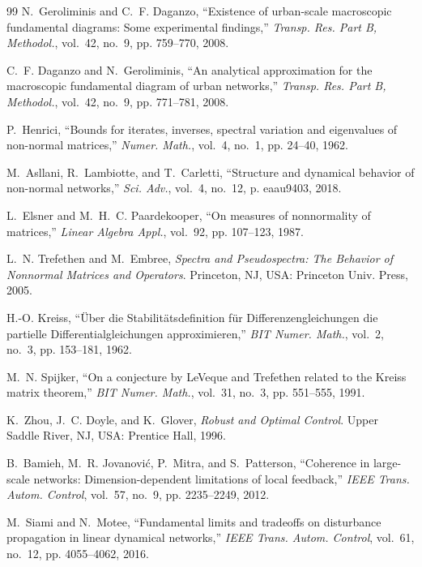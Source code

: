 \documentclass[journal]{IEEEtran}
\begin{document}
\begin{thebibliography}{99}
N.~Geroliminis and C.~F. Daganzo, ``Existence of urban-scale macroscopic fundamental diagrams: Some experimental findings,'' \emph{Transp. Res. Part B, Methodol.}, vol.~42, no.~9, pp. 759--770, 2008.

C.~F. Daganzo and N.~Geroliminis, ``An analytical approximation for the macroscopic fundamental diagram of urban networks,'' \emph{Transp. Res. Part B, Methodol.}, vol.~42, no.~9, pp. 771--781, 2008.

P.~Henrici, ``Bounds for iterates, inverses, spectral variation and eigenvalues of non-normal matrices,'' \emph{Numer. Math.}, vol.~4, no.~1, pp. 24--40, 1962.

M.~Asllani, R.~Lambiotte, and T.~Carletti, ``Structure and dynamical behavior of non-normal networks,'' \emph{Sci. Adv.}, vol.~4, no.~12, p. eaau9403, 2018.

L.~Elsner and M.~H.~C. Paardekooper, ``On measures of nonnormality of matrices,'' \emph{Linear Algebra Appl.}, vol.~92, pp. 107--123, 1987.

L.~N. Trefethen and M.~Embree, \emph{Spectra and Pseudospectra: The Behavior of Nonnormal Matrices and Operators}. Princeton, NJ, USA: Princeton Univ. Press, 2005.

H.-O. Kreiss, ``\"Uber die Stabilit\"atsdefinition f\"ur Differenzengleichungen die partielle Differentialgleichungen approximieren,'' \emph{BIT Numer. Math.}, vol.~2, no.~3, pp. 153--181, 1962.

M.~N. Spijker, ``On a conjecture by {LeVeque} and {Trefethen} related to the {Kreiss} matrix theorem,'' \emph{BIT Numer. Math.}, vol.~31, no.~3, pp. 551--555, 1991.

K.~Zhou, J.~C. Doyle, and K.~Glover, \emph{Robust and Optimal Control}. Upper Saddle River, NJ, USA: Prentice Hall, 1996.

B.~Bamieh, M.~R. Jovanovi\'c, P.~Mitra, and S.~Patterson, ``Coherence in large-scale networks: Dimension-dependent limitations of local feedback,'' \emph{IEEE Trans. Autom. Control}, vol.~57, no.~9, pp. 2235--2249, 2012.

M.~Siami and N.~Motee, ``Fundamental limits and tradeoffs on disturbance propagation in linear dynamical networks,'' \emph{IEEE Trans. Autom. Control}, vol.~61, no.~12, pp. 4055--4062, 2016.


\end{thebibliography}
\end{document}
